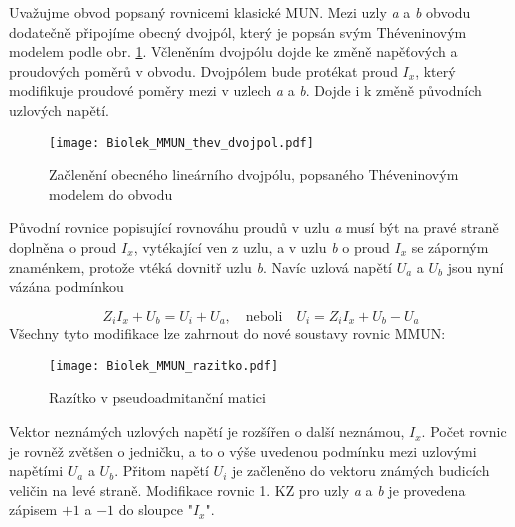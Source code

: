         Uvažujme obvod popsaný rovnicemi klasické MUN. Mezi uzly \emph{a} a \emph{b} obvodu 
        dodatečně připojíme obecný dvojpól, který je popsán svým Théveninovým modelem podle obr. 
        \ref{TEO:fig_MMUN_thev_dvojpol}. Včleněním dvojpólu dojde ke změně napěťových a proudových 
        poměrů v obvodu. Dvojpólem bude protékat proud $I_x$, který modifikuje proudové poměry mezi 
        v uzlech \emph{a} a \emph{b}. Dojde i k změně původních uzlových napětí.
        
        \begin{figure}[ht!]
          \centering
          \texttt{[image: Biolek\_MMUN\_thev\_dvojpol.pdf]}
          \caption[MMUN - Théveninův model dvojpólu]{Začlenění obecného lineárního dvojpólu, 
                   popsaného Théveninovým modelem do obvodu \cite[s.~78]{Biolek2004}}
          \label{TEO:fig_MMUN_thev_dvojpol}
        \end{figure}
        
        Původní rovnice popisující rovnováhu proudů v uzlu \emph{a} musí být na pravé straně 
        doplněna o proud $I_x$, vytékající ven z uzlu, a v uzlu \emph{b} o proud $I_x$ se záporným 
        znaménkem, protože vtéká dovnitř uzlu \emph{b}. Navíc uzlová napětí $U_a$ a $U_b$ jsou nyní 
        vázána podmínkou
        
        \begin{equation}\label{TEO:eq_MMUN_dvojpol}
          Z_iI_x + U_b = U_i + U_a, \quad\text{neboli}\quad U_i = Z_iI_x + U_b - U_a
        \end{equation}
        Všechny tyto modifikace lze zahrnout do nové soustavy rovnic MMUN:
        
        \begin{figure}[ht!]
          \centering
          \texttt{[image: Biolek\_MMUN\_razitko.pdf]}
          \caption[MMUN - razítko]{ Razítko v pseudoadmitanční matici \cite[s.~79]{Biolek2004}}
          \label{TEO:fig_MMUN_razitko}
        \end{figure}
        
        Vektor neznámých uzlových napětí je rozšířen o další neznámou, $I_x$. Počet rovnic je 
        rovněž zvětšen o jedničku, a to o výše uvedenou podmínku mezi uzlovými napětími $U_a$ a 
        $U_b$. Přitom napětí $U_i$ je začleněno do vektoru známých budicích veličin na levé straně. 
        Modifikace rovnic 1. KZ pro uzly \emph{a} a \emph{b} je provedena zápisem $+1$ a $-1$ do 
        sloupce "$I_x$".
        
